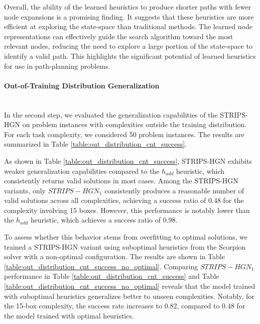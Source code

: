 Overall, the ability of the learned heuristics to produce shorter paths with fewer node expansions is a promising finding. It suggests that these heuristics are more efficient at exploring the state-space than traditional methods. The learned node representations can effectively guide the search algorithm toward the most relevant nodes, reducing the need to explore a large portion of the state-space to identify a valid path. This highlights the significant potential of learned heuristics for use in path-planning problems.






\paragraph*{Out-of-Training Distribution Generalization} \mbox{}\\
In the second step, we evaluated the generalization capabilities of the STRIPS-HGN on problem instances with complexities outside the training distribution. For each task complexity, we considered 50 problem instances. The results are summarized in Table \ref{table:out_distribution_cnt_success}.



As shown in Table \ref{table:out_distribution_cnt_success}, STRIPS-HGN exhibits weaker generalization capabilities compared to the  $h_{add}$ heuristic, which consistently returns valid solutions in most cases. Among the STRIPS-HGN variants, only $ STRIPS-HGN_1 $ consistently produces a reasonable number of valid solutions across all complexities, achieving a success ratio of 0.48 for the complexity involving 15 boxes. However, this performance is notably lower than the $ h_{add} $ heuristic, which achieves a success ratio of 0.98.

To assess whether this behavior stems from overfitting to optimal solutions, we trained a STRIPS-HGN variant using suboptimal heuristics from the Scorpion solver with a non-optimal configuration. The results are shown in Table \ref{table:out_distribution_cnt_success_no_optimal}. Comparing $STRIPS-HGN_1$ performance in Table \ref{table:out_distribution_cnt_success} and Table \ref{table:out_distribution_cnt_success_no_optimal} reveals that the model trained with suboptimal heuristics generalizes better to unseen complexities. Notably, for the 15-box complexity, the success rate increases to 0.82, compared to 0.48 for the model trained with optimal heuristics.

